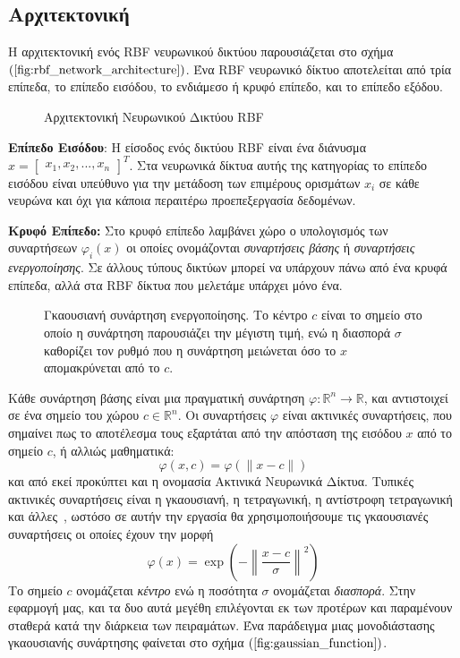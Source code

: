 \subsection{Αρχιτεκτονική}
Η αρχιτεκτονική ενός RBF νευρωνικού δικτύου παρουσιάζεται στο σχήμα $(\ref{fig:rbf_network_architecture})$. Ένα RBF νευρωνικό δίκτυο αποτελείται από τρία επίπεδα, το επίπεδο εισόδου, το ενδιάμεσο ή κρυφό επίπεδο, και το επίπεδο εξόδου.

\begin{figure}
	\centering
	
	\caption{ Αρχιτεκτονική Νευρωνικού Δικτύου RBF }
	\label{fig:rbf_network_architecture}
\end{figure}

\textbf{Επίπεδο Εισόδου}: Η είσοδος ενός δικτύου RBF είναι ένα διάνυσμα $x = \begin{bmatrix} x_1,x_2, ..., x_n \end{bmatrix}^T$. Στα νευρωνικά δίκτυα αυτής της κατηγορίας το επίπεδο εισόδου είναι υπεύθυνο για την μετάδοση των επιμέρους ορισμάτων $x_i$ σε κάθε νευρώνα και όχι για κάποια περαιτέρω προεπεξεργασία δεδομένων.

\textbf{Κρυφό Επίπεδο:} Στο κρυφό επίπεδο λαμβάνει χώρο ο υπολογισμός των συναρτήσεων $\varphi_i(x)$ οι οποίες ονομάζονται \textit{συναρτήσεις βάσης} ή \textit{συναρτήσεις ενεργοποίησης}. Σε άλλους τύπους δικτύων μπορεί να υπάρχουν πάνω από ένα κρυφά επίπεδα, αλλά στα RBF δίκτυα που μελετάμε υπάρχει μόνο ένα.

\begin{figure}
	\centering
	
	\caption{ Γκαουσιανή συνάρτηση ενεργοποίησης. Το κέντρο $c$ είναι το σημείο στο οποίο η συνάρτηση παρουσιάζει την μέγιστη τιμή, ενώ η διασπορά $\sigma$ καθορίζει τον ρυθμό που η συνάρτηση μειώνεται όσο το $x$ απομακρύνεται από το $c$. }
	\label{fig:gaussian_function}
\end{figure}

Κάθε συνάρτηση βάσης είναι μια πραγματική συνάρτηση $\varphi: \mathbb{R}^n \rightarrow \mathbb{R} $, και αντιστοιχεί σε ένα σημείο του χώρου $c \in \mathbb{R}^n$. Οι συναρτήσεις $\varphi$ είναι ακτινικές συναρτήσεις, που σημαίνει πως το αποτέλεσμα τους εξαρτάται από την απόσταση της εισόδου $x$ από το σημείο $c$, ή αλλιώς μαθηματικά:
\begin{equation*}
	\varphi(x,c) = \varphi(\| x - c \|)
\end{equation*}
και από εκεί προκύπτει και η ονομασία Ακτινικά Νευρωνικά Δίκτυα. Τυπικές ακτινικές συναρτήσεις είναι η γκαουσιανή, η τετραγωνική, η αντίστροφη τετραγωνική και άλλες~\cite{wiki:rbf}, ωστόσο σε αυτήν την εργασία θα χρησιμοποιήσουμε τις γκαουσιανές συναρτήσεις οι οποίες έχουν την μορφή
\begin{equation*}
	\varphi(x) = \exp \left( - \left\| \frac{x - c}{\sigma}\right\|^2 \right)
\end{equation*}
Το σημείο $c$ ονομάζεται \textit{κέντρο} ενώ η ποσότητα $\sigma$ ονομάζεται \textit{διασπορά}. Στην εφαρμογή μας, και τα δυο αυτά μεγέθη επιλέγονται εκ των προτέρων και παραμένουν σταθερά κατά την διάρκεια των πειραμάτων. Ένα παράδειγμα μιας μονοδιάστασης γκαουσιανής συνάρτησης φαίνεται στο σχήμα $(\ref{fig:gaussian_function})$.



